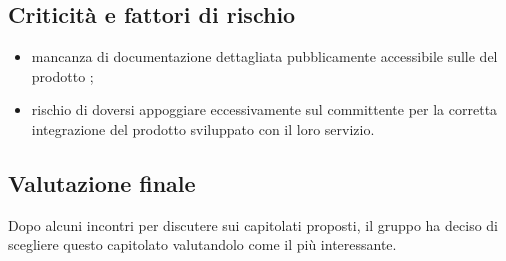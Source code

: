 \subsection{Criticità e fattori di rischio}
\begin{itemize}
\item mancanza di documentazione dettagliata pubblicamente accessibile sulle  del prodotto ;
\item rischio di doversi appoggiare eccessivamente sul committente per la corretta integrazione del prodotto sviluppato con il loro servizio.
\end{itemize}

\subsection{Valutazione finale}
Dopo alcuni incontri per discutere sui capitolati proposti, il gruppo \textit{\Gruppo{}} ha deciso di scegliere questo capitolato valutandolo come il più interessante.